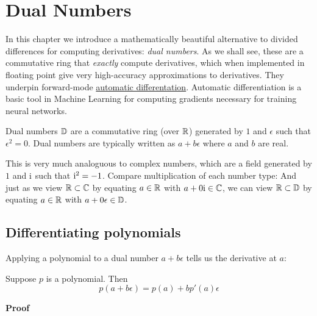 
\section{Dual Numbers}
In this chapter we introduce a mathematically beautiful  alternative to divided differences for computing derivatives: \emph{dual numbers}. As we shall see, these are a commutative ring that \emph{exactly} compute derivatives, which when implemented in floating point give very high-accuracy approximations to derivatives. They underpin forward-mode \href{https://en.wikipedia.org/wiki/Automatic_differentiation}{automatic differentation}. Automatic differentiation  is a basic tool in Machine Learning for computing gradients necessary for training neural networks.

\begin{definition} Dual numbers ${\mathbb D}$ are a commutative ring (over ${\mathbb R}$) generated by $1$ and $\ensuremath{\epsilon}$ such that $\ensuremath{\epsilon}^2 = 0$. Dual numbers are typically written as $a + b \ensuremath{\epsilon}$ where $a$ and $b$ are real. \end{definition}

This is very much analoguous to complex numbers, which are a field generated by $1$ and ${\rm i}$ such that ${\rm i}^2 = -1$. Compare multiplication of each number type:
And just as we view ${\mathbb R} \subset {\mathbb C}$ by equating $a \in {\mathbb R}$ with $a + 0{\rm i} \in {\mathbb C}$, we can view ${\mathbb R} \subset {\mathbb D}$ by equating $a \in {\mathbb R}$ with $a + 0{\rm \epsilon} \in {\mathbb D}$.

\subsection{Differentiating polynomials}
Applying a polynomial to a dual number $a + b \ensuremath{\epsilon}$ tells us the derivative at $a$:

\begin{theorem} Suppose $p$ is a polynomial. Then
\[
p(a + b \ensuremath{\epsilon}) = p(a) + b p'(a) \ensuremath{\epsilon}
\]
\end{theorem}
\textbf{Proof}

